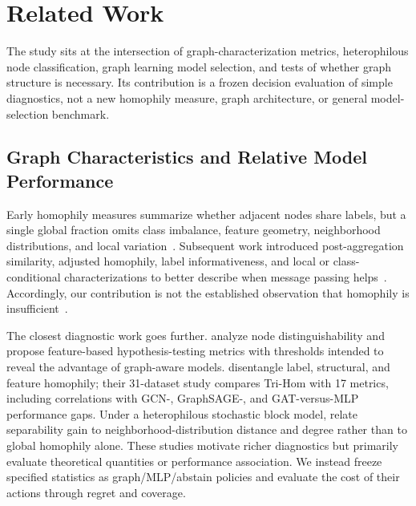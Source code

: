 
\section{Related Work}
\label{sec:related}

The study sits at the intersection of graph-characterization metrics, heterophilous node classification, graph learning model selection, and tests of whether graph structure is necessary. Its contribution is a frozen decision evaluation of simple diagnostics, not a new homophily measure, graph architecture, or general model-selection benchmark.

\subsection{Graph Characteristics and Relative Model Performance}

Early homophily measures summarize whether adjacent nodes share labels, but a single global fraction omits class imbalance, feature geometry, neighborhood distributions, and local variation~\citep{mcpherson2001homophily,zhu2020beyond}. Subsequent work introduced post-aggregation similarity, adjusted homophily, label informativeness, and local or class-conditional characterizations to better describe when message passing helps~\citep{luan2022linkx,platonov2023characterizing,loveland2024local}. Accordingly, our contribution is not the established observation that homophily is insufficient~\citep{ma2021homophily}.

The closest diagnostic work goes further. \citet{luan2023whendo} analyze node distinguishability and propose feature-based hypothesis-testing metrics with thresholds intended to reveal the advantage of graph-aware models. \citet{zheng2024trihom} disentangle label, structural, and feature homophily; their 31-dataset study compares Tri-Hom with 17 metrics, including correlations with GCN-, GraphSAGE-, and GAT-versus-MLP performance gaps. Under a heterophilous stochastic block model, \citet{pmlr-v235-wang24u} relate separability gain to neighborhood-distribution distance and degree rather than to global homophily alone. These studies motivate richer diagnostics but primarily evaluate theoretical quantities or performance association. We instead freeze specified statistics as graph/MLP/abstain policies and evaluate the cost of their actions through regret and coverage.

